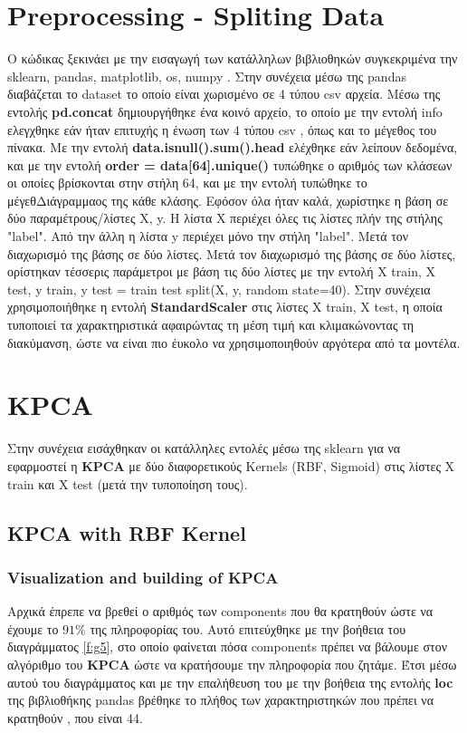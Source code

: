 \section{Preprocessing - Spliting Data}

Ο κώδικας ξεκινάει με την εισαγωγή των κατάλληλων βιβλιοθηκών συγκεκριμένα την
sklearn, pandas, matplotlib, os, numpy . Στην συνέχεια μέσω της pandas διαβάζεται
το dataset το οποίο είναι χωρισμένο σε 4 τύπου csv αρχεία. Μέσω της εντολής \textbf{pd.concat}
δημιουργήθηκε ένα κοινό αρχείο, το οποίο με την εντολή info ελεγχθηκε εάν ήταν
επιτυχής η ένωση των 4 τύπου csv , όπως και το μέγεθος του πίνακα. Με την εντολή
\textbf{data.isnull().sum().head} ελέχθηκε εάν λείπουν δεδομένα, και με την εντολή \textbf{order = data[64].unique()} τυπώθηκε ο αριθμός των κλάσεων οι οποίες βρίσκονται στην στήλη 64, και με την εντολή  τυπώθηκε το μέγεθΔιάγραμμαος της κάθε κλάσης. Εφόσον όλα ήταν καλά, χωρίστηκε η βάση σε δύο παραμέτρους/λίστες X, y. Η λίστα X περιέχει όλες τις λίστες πλήν της στήλης
"label". Από την άλλη η λίστα y περιέχει μόνο την στήλη "label". Μετά τον διαχωρισμό
της βάσης σε δύο λίστες. Μετά τον διαχωρισμό της βάσης σε δύο λίστες, ορίστηκαν
τέσσερις παράμετροι με βάση τις δύο λίστες με την εντολή X train, X test, y train, y
test = train test split(X, y, random state=40).
Στην συνέχεια χρησιμοποιήθηκε η εντολή \textbf{StandardScaler} στις λίστες Χ train, X test, η οποία τυποποιεί  τα χαρακτηριστικά αφαιρώντας τη μέση τιμή και κλιμακώνοντας τη διακύμανση, ώστε να είναι πιο έυκολο να χρησιμοποιηθούν αργότερα από τα μοντέλα.

\section{KPCA}

Στην συνέχεια εισάχθηκαν οι κατάλληλες εντολές μέσω της sklearn για να εφαρμοστεί η \textbf{KPCA} με δύο διαφορετικούς Κernels (RBF, Sigmoid) στις λίστες Χ train και Χ test (μετά την τυποποίηση τους).

\subsection{KPCA with RBF Kernel}

\subsubsection{Visualization and building of KPCA}
Αρχικά έπρεπε να βρεθεί ο αριθμός των components που θα κρατηθούν ώστε να έχουμε το $91\%$ της πληροφορίας του. Αυτό επιτεύχθηκε με την βοήθεια του διαγράμματος \ref{f:g5}, στο οποίο φαίνεται πόσα components πρέπει να βάλουμε στον αλγόριθμο του \textbf{KPCA} ώστε να κρατήσουμε την πληροφορία που ζητάμε. Έτσι μέσω αυτού του διαγράμματος και με την επαλήθευση του με την βοήθεια της εντολής \textbf{loc} της βιβλιοθήκης pandas βρέθηκε το πλήθος των χαρακτηριστηκών που πρέπει να κρατηθούν , που είναι 44.


